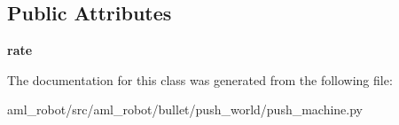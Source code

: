 \subsection*{Public Attributes}
\begin{DoxyCompactItemize}
\item 
\hypertarget{classaml__robot_1_1bullet_1_1push__world_1_1push__machine_1_1_push_machine_a43678fd25b500bff964d3b75d11cfd91}{}\label{classaml__robot_1_1bullet_1_1push__world_1_1push__machine_1_1_push_machine_a43678fd25b500bff964d3b75d11cfd91} 
{\bfseries rate}
\end{DoxyCompactItemize}


The documentation for this class was generated from the following file\+:\begin{DoxyCompactItemize}
\item 
aml\+\_\+robot/src/aml\+\_\+robot/bullet/push\+\_\+world/push\+\_\+machine.\+py\end{DoxyCompactItemize}
